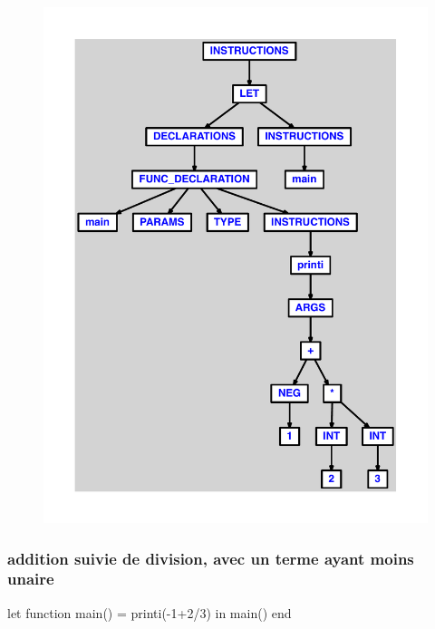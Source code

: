 \documentclass{article}
\begin{document}
\begin{figure}[H]\centering\includegraphics[max width=\textwidth]{ast/ast_69.pdf}\end{figure}\subsubsection{addition suivie de division, avec un terme ayant moins unaire}
\begin{verbatimtab}
let
	function main() = printi(-1+2/3)
in main() end
\end{verbatimtab}
\end{document}
